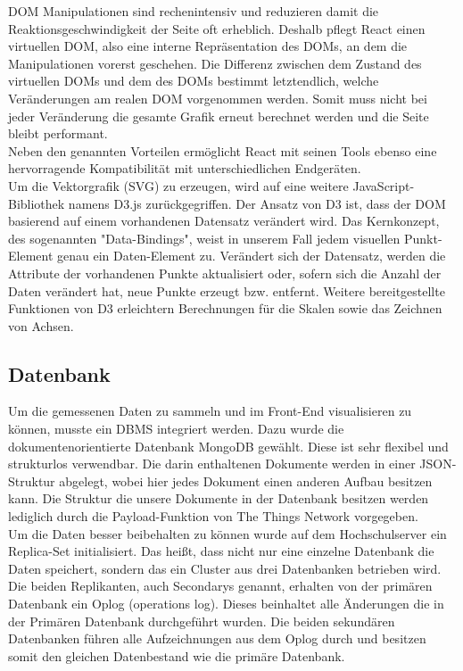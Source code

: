 \documentclass{article}
\begin{document}
DOM Manipulationen sind rechenintensiv und reduzieren damit die Reaktionsgeschwindigkeit der Seite oft erheblich. Deshalb pflegt React einen virtuellen DOM, also eine interne Repräsentation des DOMs, an dem die Manipulationen vorerst geschehen. Die Differenz zwischen dem Zustand des virtuellen DOMs und dem des DOMs bestimmt letztendlich, welche Veränderungen am realen DOM vorgenommen werden. Somit muss nicht bei jeder Veränderung die gesamte Grafik erneut berechnet werden und die Seite bleibt performant.\\

Neben den genannten Vorteilen ermöglicht React mit seinen Tools ebenso eine hervorragende Kompatibilität mit unterschiedlichen Endgeräten.\\

Um die Vektorgrafik (SVG) zu erzeugen, wird auf eine weitere JavaScript-Bibliothek namens D3.js zurückgegriffen. Der Ansatz von D3 ist, dass der DOM basierend auf einem vorhandenen Datensatz verändert wird. Das Kernkonzept, des sogenannten "Data-Bindings", weist in unserem Fall jedem visuellen Punkt-Element genau ein Daten-Element zu. Verändert sich der Datensatz, werden die Attribute der vorhandenen Punkte aktualisiert oder, sofern sich die Anzahl der Daten verändert hat, neue Punkte erzeugt bzw. entfernt.
Weitere bereitgestellte Funktionen von D3 erleichtern Berechnungen für die Skalen sowie das Zeichnen von Achsen.

\subsection{Datenbank}
Um die gemessenen Daten zu sammeln und im Front-End visualisieren zu können, musste ein DBMS integriert werden. 
Dazu wurde die dokumentenorientierte Datenbank MongoDB gewählt. Diese ist sehr flexibel und strukturlos verwendbar. 
Die darin enthaltenen Dokumente werden in einer JSON-Struktur abgelegt, wobei hier jedes Dokument einen anderen Aufbau besitzen kann. 
Die Struktur die unsere Dokumente in der Datenbank besitzen werden lediglich durch die Payload-Funktion von The Things Network vorgegeben. \\

Um die Daten besser beibehalten zu können wurde auf dem Hochschulserver ein Replica-Set initialisiert. Das heißt, dass nicht nur eine einzelne Datenbank die Daten speichert, sondern das ein Cluster aus drei Datenbanken betrieben wird. Die beiden Replikanten, auch Secondarys genannt, erhalten von der primären Datenbank ein Oplog (operations log). Dieses beinhaltet alle Änderungen die in der Primären Datenbank durchgeführt wurden. Die beiden sekundären Datenbanken führen alle Aufzeichnungen aus dem Oplog durch und besitzen somit den gleichen Datenbestand wie die primäre Datenbank.\\
\end{document}
